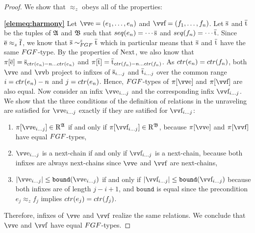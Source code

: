 \begin{proof}
We show that $\approx_{z}$ obeys all of the properties:

\noindent
\textbf{\ref{elemeq:harmony}}
Let $\elemtuptuplee = (e_{1}, \ldots, e_{n})$ and $\elemtuptuplef = (f_{1}, \ldots, f_{n})$.
Let $\overline{\mathrm{s}}$ and $\overline{\mathrm{t}}$ be the tuples of ${\mathfrak{A}}$ and ${\mathfrak{B}}$ such that $\seq{e_{n}} = \cdots \elemtuples$ and $\seq{f_{n}} = \cdots \elemtuplet$.
Since $\overline{\mathrm{e}} \approx_z \overline{\mathrm{f}}$, we know that $\elemtuples \bisimto_{\FGF}^{z} \elemtuplet$ which in particular means that $\overline{\mathrm{s}}$ and $\overline{\mathrm{t}}$ have the same $\FGF$-type.
By the properties of $\mathrm{Next}$, we also know that $\pi[\elemtuplee] = \elemtuples_{\ctr{e_{n}}-n\ldots{}\ctr{e_{n}}}$ and $\pi[\elemtuplet] = \elemtuplet_{\ctr{f_{n}}-n\ldots{}\ctr{f_{n}}}$.
As $\ctr{e_{n}} = \ctr{f_{n}}$, both $\elemtuptuplee$ and $\elemtuptupleb$ project to infixes of $\overline{\mathrm{s}}_{i\ldots{}j}$ and $\overline{\mathrm{t}}_{i\ldots{}j}$ over the common range $i = \ctr{e_{n}} - n$ and $j = \ctr{e_{n}}$.
Hence, $\FGF$-types of $\pi[\elemtuptuplee]$ and $\pi[\elemtuptuplef]$ are also equal.
Now consider an infix $\elemtuptuplee_{i\ldots{}j}$ and the corresponding infix $\elemtuptuplef_{i\ldots{}j}$.
We show that the three conditions of the definition of relations in the unraveling are satisfied for $\elemtuptuplee_{i\ldots{}j}$ exactly if they are satified for $\elemtuptuplef_{i\ldots{}j}$:
\begin{enumerate}
  \item $\pi[\elemtuptuplee_{i\ldots{}j}] \in \relR^{\str{A}}$ if and only if $\pi[\elemtuptuplef_{i\ldots{}j}] \in \relR^{\str{B}}$, because $\pi[\elemtuptuplee]$ and $\pi[\elemtuptuplef]$ have equal $\FGF$-types,
  \item $\elemtuptuplee_{i\ldots{}j}$ is a next-chain if and only if $\elemtuptuplef_{i\ldots{}j}$ is a next-chain, because both infixes are always next-chains since $\elemtuptuplee$ and $\elemtuptuplef$ are next-chains,
  \item $|\elemtuptuplee_{i\ldots{}j}| \le \mathtt{bound}(\elemtuptuplee_{i\ldots{}j})$ if and only if $|\elemtuptuplef_{i\ldots{}j}| \le \mathtt{bound}(\elemtuptuplef_{i\ldots{}j})$ because both infixes are of length $j-i+1$, and $\mathtt{bound}$ is equal since the precondition $e_{j} \approx_{z} f_{j}$ implies $\ctr{e_{j}} = \ctr{f_{j}}$.
\end{enumerate}
Therefore, infixes of $\elemtuptuplee$ and $\elemtuptuplef$ realize the same relations.
We conclude that $\elemtuptuplee$ and $\elemtuptuplef$ have equal $\FGF$-types.


\end{proof}
